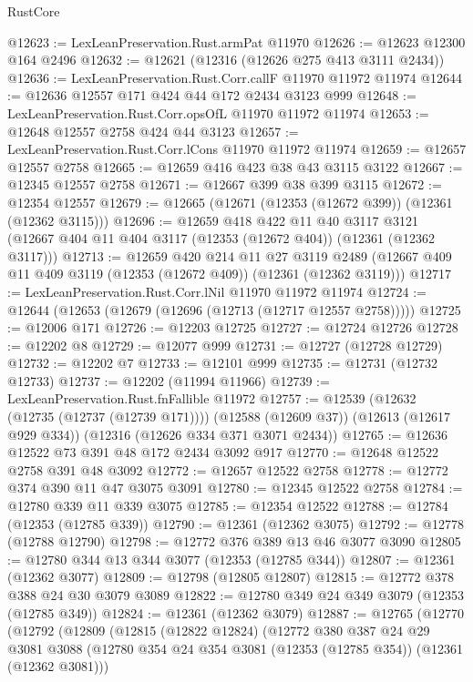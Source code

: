 \begin{lexlean}{RustCore}
\begin{coremodule}
@12623 := LexLeanPreservation.Rust.armPat @11970
@12626 := @12623 @12300 @164 @2496
@12632 := @12621 (@12316 (@12626 @275 @413 @3111 @2434))
@12636 := LexLeanPreservation.Rust.Corr.callF @11970 @11972 @11974
@12644 := @12636 @12557 @171 @424 @44 @172 @2434 @3123 @999
@12648 := LexLeanPreservation.Rust.Corr.opsOfL @11970 @11972 @11974
@12653 := @12648 @12557 @2758 @424 @44 @3123
@12657 := LexLeanPreservation.Rust.Corr.lCons @11970 @11972 @11974
@12659 := @12657 @12557 @2758
@12665 := @12659 @416 @423 @38 @43 @3115 @3122
@12667 := @12345 @12557 @2758
@12671 := @12667 @399 @38 @399 @3115
@12672 := @12354 @12557
@12679 := @12665 (@12671 (@12353 (@12672 @399)) (@12361 (@12362 @3115)))
@12696 := @12659
    @418
    @422
    @11
    @40
    @3117
    @3121
    (@12667 @404 @11 @404 @3117 (@12353 (@12672 @404)) (@12361 (@12362 @3117)))
@12713 := @12659
    @420
    @214
    @11
    @27
    @3119
    @2489
    (@12667 @409 @11 @409 @3119 (@12353 (@12672 @409)) (@12361 (@12362 @3119)))
@12717 := LexLeanPreservation.Rust.Corr.lNil @11970 @11972 @11974
@12724 := @12644 (@12653 (@12679 (@12696 (@12713 (@12717 @12557 @2758)))))
@12725 := @12006 @171
@12726 := @12203 @12725
@12727 := @12724 @12726
@12728 := @12202 @8
@12729 := @12077 @999
@12731 := @12727 (@12728 @12729)
@12732 := @12202 @7
@12733 := @12101 @999
@12735 := @12731 (@12732 @12733)
@12737 := @12202 (@11994 @11966)
@12739 := LexLeanPreservation.Rust.fnFallible @11972
@12757 := @12539
    (@12632 (@12735 (@12737 (@12739 @171))))
    (@12588 (@12609 @37))
    (@12613 (@12617 @929 @334))
    (@12316 (@12626 @334 @371 @3071 @2434))
@12765 := @12636 @12522 @73 @391 @48 @172 @2434 @3092 @917
@12770 := @12648 @12522 @2758 @391 @48 @3092
@12772 := @12657 @12522 @2758
@12778 := @12772 @374 @390 @11 @47 @3075 @3091
@12780 := @12345 @12522 @2758
@12784 := @12780 @339 @11 @339 @3075
@12785 := @12354 @12522
@12788 := @12784 (@12353 (@12785 @339))
@12790 := @12361 (@12362 @3075)
@12792 := @12778 (@12788 @12790)
@12798 := @12772 @376 @389 @13 @46 @3077 @3090
@12805 := @12780 @344 @13 @344 @3077 (@12353 (@12785 @344))
@12807 := @12361 (@12362 @3077)
@12809 := @12798 (@12805 @12807)
@12815 := @12772 @378 @388 @24 @30 @3079 @3089
@12822 := @12780 @349 @24 @349 @3079 (@12353 (@12785 @349))
@12824 := @12361 (@12362 @3079)
@12887 := @12765
    (@12770
      (@12792
        (@12809
          (@12815
            (@12822 @12824)
            (@12772
              @380
              @387
              @24
              @29
              @3081
              @3088
              (@12780 @354 @24 @354 @3081 (@12353 (@12785 @354)) (@12361 (@12362 @3081)))

\end{coremodule}
\end{lexlean}
